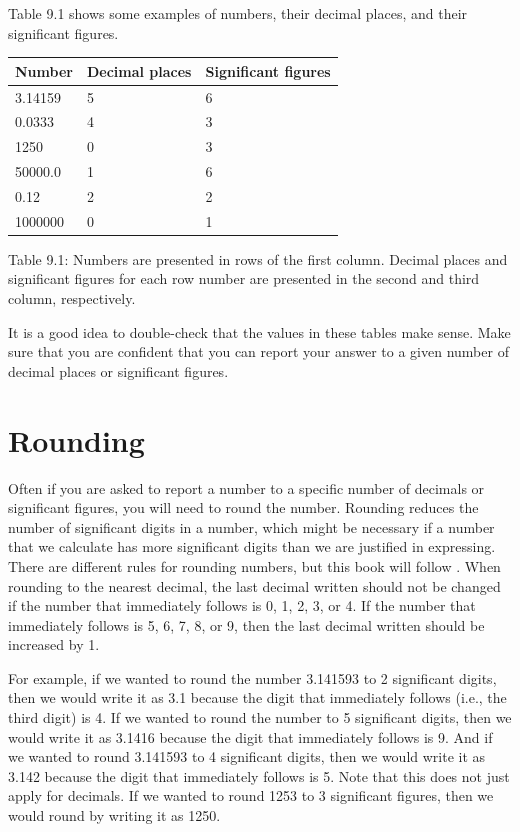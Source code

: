 \documentclass[
]{scrbook}
\begin{document}
Table 9.1 shows some examples of numbers, their decimal places, and their significant figures.

\begin{longtable}[]{@{}lll@{}}
\toprule
Number & Decimal places & Significant figures \\
\midrule
\endhead
3.14159 & 5 & 6 \\
0.0333 & 4 & 3 \\
1250 & 0 & 3 \\
50000.0 & 1 & 6 \\
0.12 & 2 & 2 \\
1000000 & 0 & 1 \\
\bottomrule
\end{longtable}

Table 9.1: Numbers are presented in rows of the first column. Decimal places and significant figures for each row number are presented in the second and third column, respectively.

It is a good idea to double-check that the values in these tables make sense.
Make sure that you are confident that you can report your answer to a given number of decimal places or significant figures.

\hypertarget{rounding}{%
\section{Rounding}\label{rounding}}

Often if you are asked to report a number to a specific number of decimals or significant figures, you will need to round the number.
Rounding reduces the number of significant digits in a number, which might be necessary if a number that we calculate has more significant digits than we are justified in expressing.
There are different rules for rounding numbers, but this book will follow \citet{Sokal1995}.
When rounding to the nearest decimal, the last decimal written should not be changed if the number that immediately follows is 0, 1, 2, 3, or 4.
If the number that immediately follows is 5, 6, 7, 8, or 9, then the last decimal written should be increased by 1.

For example, if we wanted to round the number 3.141593 to 2 significant digits, then we would write it as 3.1 because the digit that immediately follows (i.e., the third digit) is 4.
If we wanted to round the number to 5 significant digits, then we would write it as 3.1416 because the digit that immediately follows is 9.
And if we wanted to round 3.141593 to 4 significant digits, then we would write it as 3.142 because the digit that immediately follows is 5.
Note that this does not just apply for decimals.
If we wanted to round 1253 to 3 significant figures, then we would round by writing it as 1250.
\end{document}
